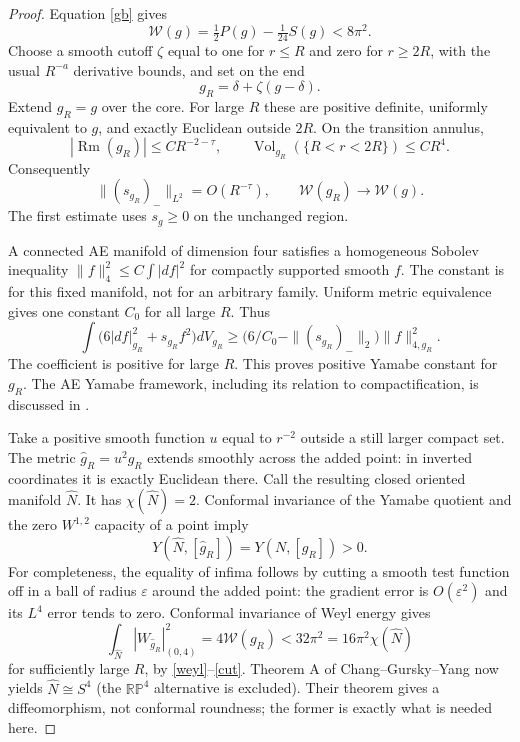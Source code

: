 \documentclass[11pt]{article}
\newcommand{\Vol}{\operatorname{Vol}}
\newcommand{\W}{\mathcal W}
\begin{document}
\begin{proof}
Equation \eqref{gb} gives
\begin{equation}\label{weyl}
 \W(g)=\tfrac12P(g)-\tfrac1{24}S(g)<8\pi^2.
\end{equation}
Choose a smooth cutoff $\zeta$ equal to one for $r\le R$ and zero for
$r\ge2R$, with the usual $R^{-a}$ derivative bounds, and set on the end
\[
 g_R=\delta+\zeta(g-\delta).
\]
Extend $g_R=g$ over the core. For large $R$ these are positive definite,
uniformly equivalent to $g$, and exactly Euclidean outside $2R$.
On the transition annulus,
\[
 |\operatorname{Rm}(g_R)|\le C R^{-2-\tau},\qquad
 \Vol_{g_R}(\{R<r<2R\})\le C R^4.
\]
Consequently
\begin{equation}\label{cut}
 \|(s_{g_R})_-\|_{L^2}=O(R^{-\tau}),\qquad
 \W(g_R)\longrightarrow\W(g).
\end{equation}
The first estimate uses $s_g\ge0$ on the unchanged region.

A connected AE manifold of dimension four satisfies a homogeneous Sobolev
inequality $\|f\|_4^2\le C\int|df|^2$ for compactly supported smooth $f$.
The constant is for this fixed manifold, not for an arbitrary family.
Uniform metric equivalence gives one constant $C_0$ for all large $R$.
Thus
\[
 \int\bigl(6|df|_{g_R}^2+s_{g_R}f^2\bigr)dV_{g_R}
 \ge\bigl(6/C_0-\|(s_{g_R})_-\|_2\bigr)\|f\|_{4,g_R}^2.
\]
The coefficient is positive for large $R$. This proves positive Yamabe
constant for $g_R$. The AE Yamabe framework, including its relation to
compactification, is discussed in \cite{DM}.

Take a positive smooth function $u$ equal to $r^{-2}$ outside a still larger
compact set. The metric $\widehat g_R=u^2g_R$ extends smoothly across the
added point: in inverted coordinates it is exactly Euclidean there.
Call the resulting closed oriented manifold $\widehat N$. It has
$\chi(\widehat N)=2$. Conformal invariance of the Yamabe quotient and
the zero $W^{1,2}$ capacity of a point imply
\[
 Y(\widehat N,[\widehat g_R])=Y(N,[g_R])>0.
\]
For completeness, the equality of infima follows by cutting a smooth
test function off in a ball of radius $\varepsilon$ around the added point:
the gradient error is $O(\varepsilon^2)$ and its $L^4$ error tends to zero.
Conformal invariance of Weyl energy gives
\[
 \int_{\widehat N}|W_{\widehat g_R}|_{(0,4)}^2
 =4\W(g_R)<32\pi^2=16\pi^2\chi(\widehat N)
\]
for sufficiently large $R$, by \eqref{weyl}--\eqref{cut}.
Theorem A of Chang--Gursky--Yang \cite{CGY} now yields
$\widehat N\cong S^4$ (the $\mathbb{RP}^4$ alternative is excluded).
Their theorem gives a diffeomorphism, not conformal roundness; the former
is exactly what is needed here.


\end{proof}
\end{document}
